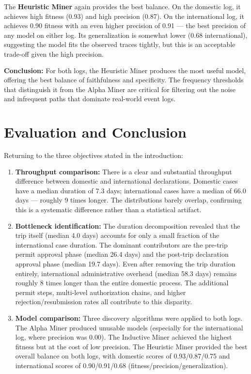 \documentclass[11pt,a4paper]{article}
\begin{document}
The \textbf{Heuristic Miner} again provides the best balance. On the domestic log, it achieves high fitness (0.93) and high precision (0.87). On the international log, it achieves 0.90 fitness with an even higher precision of 0.91 — the best precision of any model on either log. Its generalization is somewhat lower (0.68 international), suggesting the model fits the observed traces tightly, but this is an acceptable trade-off given the high precision.

\textbf{Conclusion:} For both logs, the Heuristic Miner produces the most useful model, offering the best balance of faithfulness and specificity. The frequency thresholds that distinguish it from the Alpha Miner are critical for filtering out the noise and infrequent paths that dominate real-world event logs.

\section{Evaluation and Conclusion}

Returning to the three objectives stated in the introduction:

\begin{enumerate}[leftmargin=*]
    \item \textbf{Throughput comparison:} There is a clear and substantial throughput difference between domestic and international declarations. Domestic cases have a median duration of 7.3 days; international cases have a median of 66.0 days — roughly 9 times longer. The distributions barely overlap, confirming this is a systematic difference rather than a statistical artifact.

    \item \textbf{Bottleneck identification:} The duration decomposition revealed that the trip itself (median 4.0 days) accounts for only a small fraction of the international case duration. The dominant contributors are the pre-trip permit approval phase (median 26.4 days) and the post-trip declaration approval phase (median 19.7 days). Even after removing the trip duration entirely, international administrative overhead (median 58.3 days) remains roughly 8 times longer than the entire domestic process. The additional permit steps, multi-level authorization chains, and higher rejection/resubmission rates all contribute to this disparity.

    \item \textbf{Model comparison:} Three discovery algorithms were applied to both logs. The Alpha Miner produced unusable models (especially for the international log, where precision was 0.00). The Inductive Miner achieved the highest fitness but at the cost of low precision. The Heuristic Miner provided the best overall balance on both logs, with domestic scores of 0.93/0.87/0.75 and international scores of 0.90/0.91/0.68 (fitness/precision/generalization).
\end{enumerate}
\end{document}
